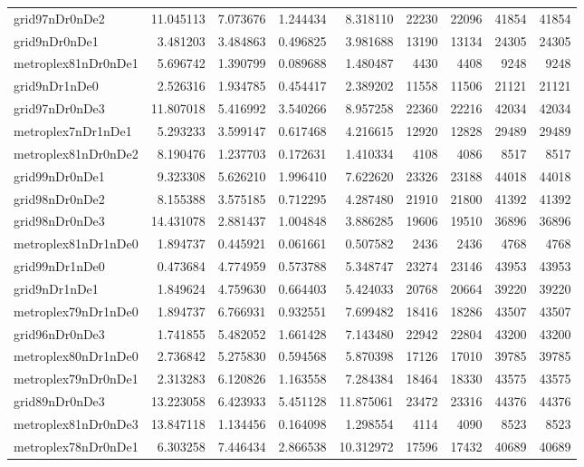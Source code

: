 \begin{longtable}{|l|r|r|r|r|r|r|r|r|}
grid97nDr0nDe2 & 11.045113 & 7.073676 & 1.244434 & 8.318110 & 22230 & 22096 & 41854 & 41854 \\
grid9nDr0nDe1 & 3.481203 & 3.484863 & 0.496825 & 3.981688 & 13190 & 13134 & 24305 & 24305 \\
metroplex81nDr0nDe1 & 5.696742 & 1.390799 & 0.089688 & 1.480487 & 4430 & 4408 & 9248 & 9248 \\
grid9nDr1nDe0 & 2.526316 & 1.934785 & 0.454417 & 2.389202 & 11558 & 11506 & 21121 & 21121 \\
grid97nDr0nDe3 & 11.807018 & 5.416992 & 3.540266 & 8.957258 & 22360 & 22216 & 42034 & 42034 \\
metroplex7nDr1nDe1 & 5.293233 & 3.599147 & 0.617468 & 4.216615 & 12920 & 12828 & 29489 & 29489 \\
metroplex81nDr0nDe2 & 8.190476 & 1.237703 & 0.172631 & 1.410334 & 4108 & 4086 & 8517 & 8517 \\
grid99nDr0nDe1 & 9.323308 & 5.626210 & 1.996410 & 7.622620 & 23326 & 23188 & 44018 & 44018 \\
grid98nDr0nDe2 & 8.155388 & 3.575185 & 0.712295 & 4.287480 & 21910 & 21800 & 41392 & 41392 \\
grid98nDr0nDe3 & 14.431078 & 2.881437 & 1.004848 & 3.886285 & 19606 & 19510 & 36896 & 36896 \\
metroplex81nDr1nDe0 & 1.894737 & 0.445921 & 0.061661 & 0.507582 & 2436 & 2436 & 4768 & 4768 \\
grid99nDr1nDe0 & 0.473684 & 4.774959 & 0.573788 & 5.348747 & 23274 & 23146 & 43953 & 43953 \\
grid9nDr1nDe1 & 1.849624 & 4.759630 & 0.664403 & 5.424033 & 20768 & 20664 & 39220 & 39220 \\
metroplex79nDr1nDe0 & 1.894737 & 6.766931 & 0.932551 & 7.699482 & 18416 & 18286 & 43507 & 43507 \\
grid96nDr0nDe3 & 1.741855 & 5.482052 & 1.661428 & 7.143480 & 22942 & 22804 & 43200 & 43200 \\
metroplex80nDr1nDe0 & 2.736842 & 5.275830 & 0.594568 & 5.870398 & 17126 & 17010 & 39785 & 39785 \\
metroplex79nDr0nDe1 & 2.313283 & 6.120826 & 1.163558 & 7.284384 & 18464 & 18330 & 43575 & 43575 \\
grid89nDr0nDe3 & 13.223058 & 6.423933 & 5.451128 & 11.875061 & 23472 & 23316 & 44376 & 44376 \\
metroplex81nDr0nDe3 & 13.847118 & 1.134456 & 0.164098 & 1.298554 & 4114 & 4090 & 8523 & 8523 \\
metroplex78nDr0nDe1 & 6.303258 & 7.446434 & 2.866538 & 10.312972 & 17596 & 17432 & 40689 & 40689 \\

\end{longtable}
